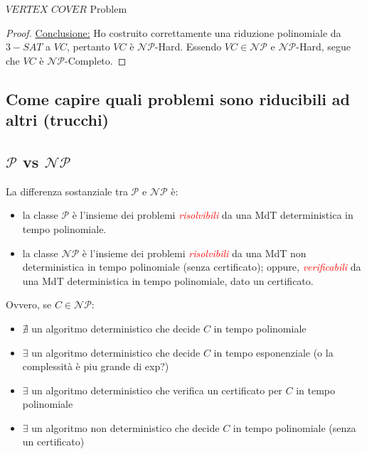 \documentclass{article}  %
\theoremstyle{definition}
\begin{document}
\begin{theorem}{$VERTEX$ $COVER$ Problem}
\begin{proof}
		\underline{Conclusione:} Ho costruito correttamente una riduzione polinomiale da $3-SAT$ a $VC$, pertanto $VC$ è $\mathcal{NP}$-Hard.
		Essendo $VC \in \mathcal{NP}$ e $\mathcal{NP}$-Hard, segue che $VC$ è $\mathcal{NP}$-Completo.
	\end{proof}
\end{theorem}
\break
\subsection{Come capire quali problemi sono riducibili ad altri (trucchi)}
\subsection{$\mathcal{P}$ vs $\mathcal{NP}$}
La differenza sostanziale tra $\mathcal{P}$ e $\mathcal{NP}$ è:
\begin{itemize}
	\item la classe $\mathcal{P}$ è l'insieme dei problemi \textcolor{red}{\textit{risolvibili}} da una MdT deterministica in tempo polinomiale.
	\item la classe $\mathcal{NP}$ è l'insieme dei problemi \textcolor{red}{\textit{risolvibili}} da una MdT non deterministica in tempo polinomiale (senza
	      certificato); oppure,\textcolor{red}{\textit{ verificabili}} da una MdT deterministica in tempo polinomiale, dato un certificato.
\end{itemize}
Ovvero, se $C \in \mathcal{NP}$:
\begin{itemize}
	\item $\nexists$ un algoritmo deterministico che decide $C$ in tempo polinomiale
	\item $\exists$ un algoritmo deterministico che decide $C$ in tempo esponenziale (o la complessità è piu grande di exp?)
	\item $\exists$ un algoritmo deterministico che verifica un certificato per $C$ in tempo polinomiale
	\item $\exists$ un algoritmo non deterministico che decide $C$ in tempo polinomiale (senza un certificato)
\end{itemize}
\end{document}
